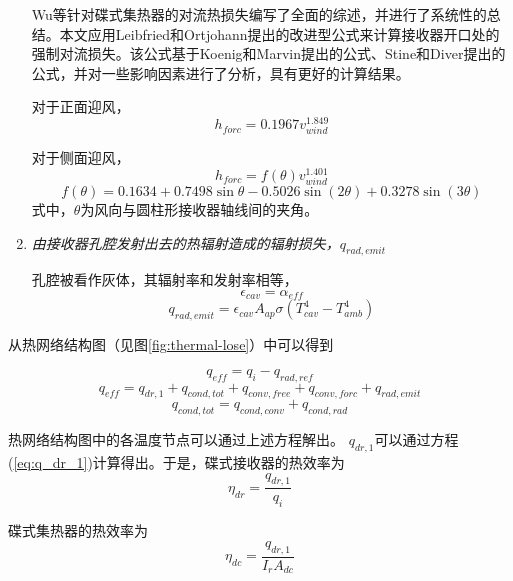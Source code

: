 \begin{enumerate}[label=(\arabic*)]
    Wu等\cite{Wu2010}针对碟式集热器的对流热损失编写了全面的综述，并进行了系统性的总结。本文应用Leibfried和Ortjohann\cite{Leibfried1995}提出的改进型公式来计算接收器开口处的强制对流损失。该公式基于Koenig和Marvin\cite{Koenig1981}提出的公式、Stine和Diver\cite{Stine1994}提出的公式，并对一些影响因素进行了分析，具有更好的计算结果。

对于正面迎风，
\begin{equation}
	h_{forc}=0.1967v_{wind}^{1.849}
\end{equation}

对于侧面迎风，
\begin{equation}
	h_{forc}=f(\theta)v_{wind}^{1.401}
\end{equation}
\begin{equation}
	f(\theta)=0.1634 + 0.7498\sin\theta - 0.5026\sin(2\theta) + 0.3278\sin(3\theta)
\end{equation}
式中，$\theta$为风向与圆柱形接收器轴线间的夹角。

  \item \emph{由接收器孔腔发射出去的热辐射造成的辐射损失，$q_{rad,emit}$}
  
  孔腔被看作灰体，其辐射率和发射率相等，
\begin{equation}
    \epsilon_{cav}=\alpha_{eff}
\end{equation}
\begin{equation}
    q_{rad,emit}=\epsilon_{cav}A_{ap}\sigma(T_{cav}^{4}-T_{amb}^{4})
\end{equation}
\end{enumerate}

从热网络结构图（见图\ref{fig:thermal-lose}）中可以得到

\begin{equation}
  q_{eff} = q_i - q_{rad,ref}
\end{equation}
\begin{equation}
  q_{eff} = q_{dr,1} + q_{cond,tot} + q_{conv,free} + q_{conv,forc}+q_{rad,emit}
\end{equation}
\begin{equation}
  q_{cond,tot} = q_{cond,conv}+q_{cond,rad}
\end{equation}


热网络结构图中的各温度节点可以通过上述方程解出。
$q_{dr,1}$可以通过方程(\ref{eq:q_dr_1})计算得出。于是，碟式接收器的热效率为
\begin{equation}
  \eta_{dr} = \frac{q_{dr,1}}{q_i}
\end{equation}

碟式集热器的热效率为
\begin{equation}
  \eta_{dc} = \frac{q_{dr,1}}{I_rA_{dc}}
\end{equation}

